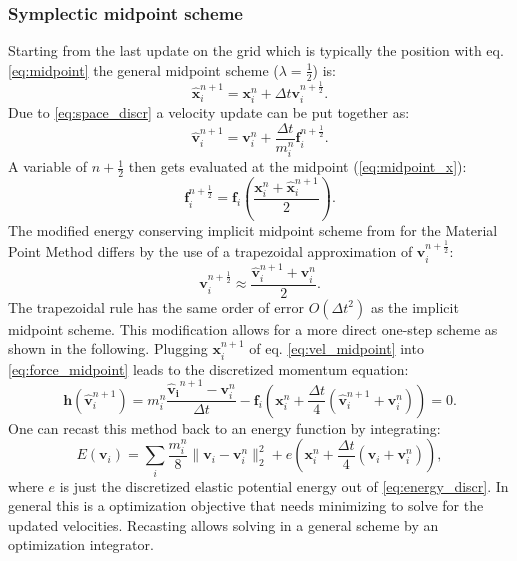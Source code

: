 \documentclass[m,times]{cgMA}
\begin{document}
\subsubsection{Symplectic midpoint scheme}
Starting from the last update on the grid which is typically the position with eq. \ref{eq:midpoint} the general midpoint scheme ($\lambda=\frac{1}{2}$) is:
\begin{equation}\label{eq:vel_midpoint}
  \boldsymbol{\hat{x}}_i^{n+1}   =\boldsymbol{x}_i^{n} + \Delta t \boldsymbol{v}_i^{n+\frac{1}{2}}.
\end{equation}
Due to \ref{eq:space_discr} a velocity update can be put together as:
\begin{equation}\label{eq:force_midpoint}
\boldsymbol{\hat{v}}^{n+1}_i
= \boldsymbol{v}^n_i+ \frac{\Delta t}{m_i^n}\boldsymbol{f}_i^{n+\frac{1}{2}}.
\end{equation}
A variable of $n+\frac{1}{2}$ then gets evaluated at the midpoint (\ref{eq:midpoint_x}):
\begin{equation}
  \boldsymbol{f}^{n+\frac{1}{2}}_i =  \boldsymbol{f}_i\left(\frac{\boldsymbol{x}_i^n + \boldsymbol{\hat{x}}_i^{n+1}}{2}\right).
\end{equation}
The modified energy conserving implicit midpoint scheme from \cite{GONZALEZ} for the Material Point Method differs by the use of a trapezoidal approximation of $\boldsymbol{v}_i^{n+\frac{1}{2}}$:
\begin{equation}\label{eq:trapezoidal}
  \boldsymbol{v}_i^{n+\frac{1}{2}} \approx \frac{\boldsymbol{\hat{v}}_i^{n+1} + \boldsymbol{v}_i^{n}}{2}.
\end{equation}
The trapezoidal rule has the same order of error $O(\Delta t^2)$ as the implicit midpoint scheme. This modification allows for a more direct one-step scheme as shown in the following. Plugging $\boldsymbol{x}_i^{n+1}$ of eq. \ref{eq:vel_midpoint} into \ref{eq:force_midpoint} leads to the discretized momentum equation:
\begin{equation}
  \boldsymbol{h}(\boldsymbol{\hat{v}}_i^{n+1}) = m_i^n \frac{\boldsymbol{\hat{v}_i}^{n+1}-\boldsymbol{v}_i^n}{\Delta t} - \boldsymbol{f}_i\left(\boldsymbol{x}_i^n + \frac{\Delta t}{4} (\boldsymbol{\hat{v}}_i^{n+1} + \boldsymbol{v}_i^{n})\right) = 0.
\end{equation}
One can recast this method back to an energy function by integrating:
\begin{equation}
  E(\boldsymbol{v}_i) = \sum_i \frac{m_i^n}{8} \|\boldsymbol{v}_i - \boldsymbol{v}_i^n\|^2_2 + e(\boldsymbol{x}_i^n + \frac{\Delta t}{4}(\boldsymbol{v}_i + \boldsymbol{v}_i^n)),
\end{equation}
where $e$ is just the discretized elastic potential energy out of \ref{eq:energy_discr}. In general this is a optimization objective that needs minimizing to solve for the updated velocities. Recasting allows solving in a general scheme by an optimization integrator.
\end{document}
